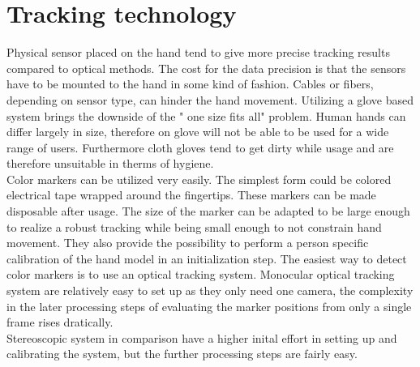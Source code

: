 \section{Tracking technology}
Physical sensor placed on the hand tend to give more precise tracking results compared to optical methods. The cost for the data precision is that the sensors have to be mounted to the hand in some kind of fashion. Cables or fibers, depending on sensor type, can hinder the hand movement. Utilizing  a glove based system brings the downside of the " one size fits all" problem. Human hands can differ largely in size, therefore on glove will not be able to be used for a wide range of users. Furthermore cloth gloves tend to get dirty while usage and are therefore unsuitable in therms of hygiene.\\

Color markers can be utilized very easily. The simplest form could be colored electrical tape wrapped around the fingertips. These markers can be made disposable after usage. The size of the marker can be adapted to be large enough to realize a robust tracking while being small enough to not constrain hand movement. They also provide the possibility to perform a person specific calibration of the hand model in an initialization step.
The easiest way to detect color markers is to use an optical tracking system.
Monocular optical tracking system are relatively easy to set up as they only need one camera, the complexity in the later processing steps of evaluating the marker positions from  only a single frame rises dratically.\\
Stereoscopic system in comparison have a higher inital effort in setting up and calibrating the system, but the further processing steps are fairly easy. 

